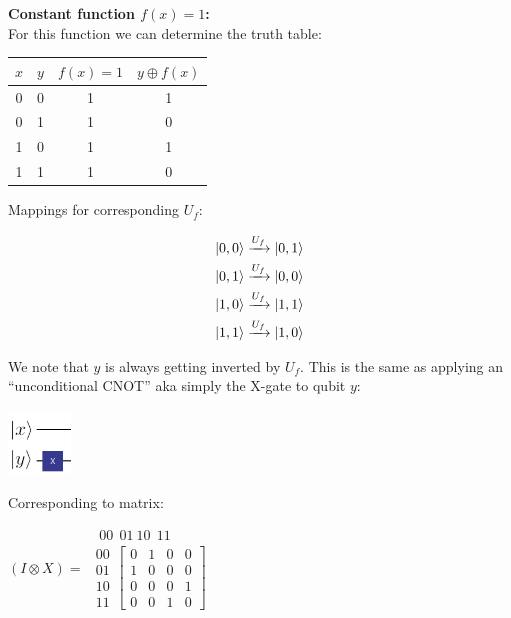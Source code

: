 \documentclass[conference]{IEEEtran}
\begin{document}
\begin{appendices}
\textbf{Constant function $f(x) = 1$:} \\

For this function we can determine the truth table:

\begin{center}
\begin{tabular}{|c|c|c|c|}
    \hline
    $x$ & $y$ & $f(x) = 1$ & $y \oplus f(x)$\\
    \hline
    0 & 0 & 1 & 1 \\
    0 & 1 & 1 & 0 \\
    1 & 0 & 1 & 1 \\
    1 & 1 & 1 & 0 \\
    \hline
\end{tabular}
\end{center}

Mappings for corresponding $U_f$:

\begin{gather*}
    \ket{0, 0} \xrightarrow{U_f} \ket{0, 1} \\
    \ket{0, 1} \xrightarrow{U_f} \ket{0, 0} \\
    \ket{1, 0} \xrightarrow{U_f} \ket{1, 1} \\
    \ket{1, 1} \xrightarrow{U_f} \ket{1, 0} \\
\end{gather*}

We note that $y$ is always getting inverted by $U_f$. This is the same as applying an ``unconditional CNOT''
aka simply the X-gate to qubit $y$:

\centerline{
    \includegraphics[width=0.125\textwidth]{img/oracle_f_x_on_y.png}
}

Corresponding to matrix:

\begin{center}
$
(I \otimes X) =
\begin{matrix}
    \ \ \ {\scriptstyle 00} \ \ {\scriptstyle 01} \ {\scriptstyle 10} \ \ {\scriptstyle 11}
    \\
    \begin{matrix}
    {\scriptstyle 00} \\
    {\scriptstyle 01} \\
    {\scriptstyle 10} \\
    {\scriptstyle 11}
    \end{matrix}
    \begin{bmatrix}
    0 & 1 & 0 & 0 \\
    1 & 0 & 0 & 0 \\
    0 & 0 & 0 & 1 \\
    0 & 0 & 1 & 0
    \end{bmatrix}
\end{matrix}
$
\end{center}
 \ \\



\end{appendices}
\end{document}
